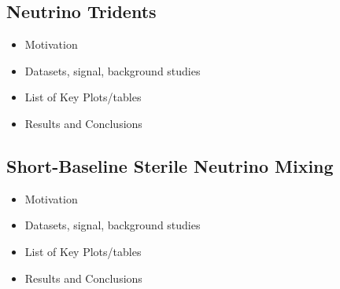 \subsection{Neutrino Tridents}
\begin{itemize}
\item Motivation
\item Datasets, signal, background studies
\item List of Key Plots/tables
\item Results and Conclusions
\end{itemize}

\subsection{Short-Baseline Sterile Neutrino Mixing}
\begin{itemize}
\item Motivation
\item Datasets, signal, background studies
\item List of Key Plots/tables
\item Results and Conclusions
\end{itemize}





